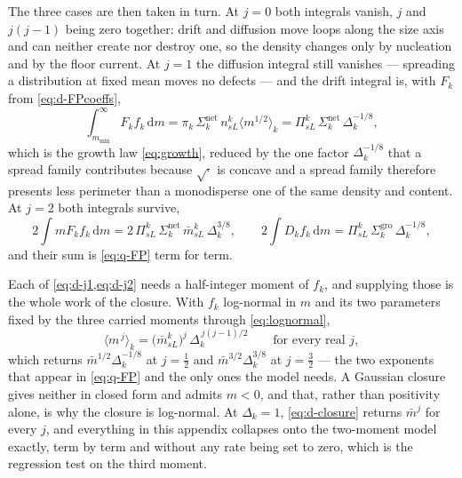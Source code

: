The three cases are then taken in turn. At $j=0$ both integrals vanish, $j$ and
$j(j-1)$ being zero together: drift and diffusion move loops along the size axis
and can neither create nor destroy one, so the density changes only by
nucleation and by the floor current. At $j=1$ the diffusion integral still
vanishes --- spreading a distribution at fixed mean moves no defects --- and the
drift integral is, with $F_k$ from \cref{eq:d-FPcoeffs},
\begin{equation}
  \int_{m_{\min}}^{\infty}\!\!F_kf_k\,\mathrm dm
   =\pi_k\,\Sigma^{\mathrm{net}}_k\,n^k_{sL}\bigl\langle m^{1/2}\bigr\rangle_k
   =\Pi^k_{sL}\,\Sigma^{\mathrm{net}}_k\,\Delta_k^{-1/8},
  \label{eq:d-j1}
\end{equation}
which is the growth law \cref{eq:growth}, reduced by the one factor
$\Delta_k^{-1/8}$ that a spread family contributes because $\sqrt{\cdot}$ is
concave and a spread family therefore presents less perimeter than a
monodisperse one of the same density and content. At $j=2$ both integrals
survive,
\begin{equation}
  2\!\int\!mF_kf_k\,\mathrm dm
   =2\,\Pi^k_{sL}\,\Sigma^{\mathrm{net}}_k\,\bar m^k_{sL}\,\Delta_k^{3/8},
  \qquad
  2\!\int\!D_kf_k\,\mathrm dm
   =\Pi^k_{sL}\,\Sigma^{\mathrm{gro}}_k\,\Delta_k^{-1/8},
  \label{eq:d-j2}
\end{equation}
and their sum is \cref{eq:q-FP} term for term.

Each of \cref{eq:d-j1,eq:d-j2} needs a half-integer moment of $f_k$, and
supplying those is the whole work of the closure. With $f_k$ log-normal in $m$
and its two parameters fixed by the three carried moments through
\cref{eq:lognormal},
\begin{equation}
  \bigl\langle m^{\,j}\bigr\rangle_k
   =\bigl(\bar m^k_{sL}\bigr)^{j}\,\Delta_k^{\,j(j-1)/2}
  \qquad\text{for every real }j,
  \label{eq:d-closure}
\end{equation}
which returns $\bar m^{1/2}\Delta_k^{-1/8}$ at $j=\tfrac12$ and
$\bar m^{3/2}\Delta_k^{3/8}$ at $j=\tfrac32$ --- the two exponents that appear in
\cref{eq:q-FP} and the only ones the model needs. A Gaussian closure gives
neither in closed form and admits $m<0$, and that, rather than positivity alone,
is why the closure is log-normal. At $\Delta_k=1$, \cref{eq:d-closure} returns
$\bar m^{j}$ for every $j$, and everything in this appendix collapses onto the
two-moment model exactly, term by term and without any rate being set to zero,
which is the regression test on the third moment.

